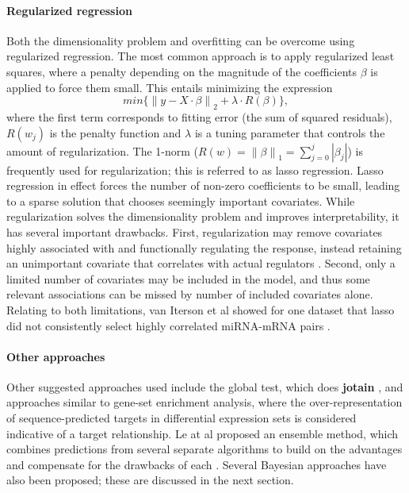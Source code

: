 \paragraph{Regularized regression}
Both the dimensionality problem and overfitting can be overcome using regularized
regression. The most common approach is to apply regularized least squares,
where a penalty depending on the magnitude of the coefficients $\beta$
is applied to force them small. This entails minimizing the expression
\begin{equation}
	min\{ \left \| y - X \cdot \beta \right \|_2 + \lambda \cdot R(\beta) \} ,
\end{equation}
where the first term corresponds to fitting error (the sum of squared residuals),
$R(w_j)$ is the penalty function and $\lambda$ is a tuning
parameter that controls the amount of regularization. 
The 1-norm ($R(w) = \left \| \beta \right \|_1 = \sum_{j=0}^{j} \left | \beta_j \right |$)
is frequently used for regularization; this is referred to as lasso regression.
Lasso regression in effect forces the number of non-zero coefficients to be small,
leading to a sparse solution that chooses seemingly important covariates.
While regularization solves the dimensionality problem and improves
interpretability, it has several important drawbacks. First, regularization
may remove covariates highly associated with and functionally regulating the
response, instead retaining an unimportant covariate that correlates with
actual regulators \citep{Engelmann2012}. Second, only a limited number of
covariates may be included in the model, and thus some relevant associations
can be missed by number of included covariates alone.%
Relating to both limitations, van Iterson et al showed for one dataset that
lasso did not consistently select highly correlated miRNA-mRNA pairs
\citep{vanIterson2013}.

\paragraph{Other approaches}
Other suggested approaches used include the global test, which does \textbf{jotain}
\citep{vanIterson2013}, and approaches similar to gene-set enrichment
analysis, where the over-representation of sequence-predicted targets in
differential expression sets is considered indicative of a target
relationship. Le at al proposed an ensemble method, which
combines predictions from several separate algorithms to
build on the advantages and compensate for the drawbacks of each
\citep{Le2015}.
Several Bayesian approaches have also been proposed;
these are discussed in the next section.


